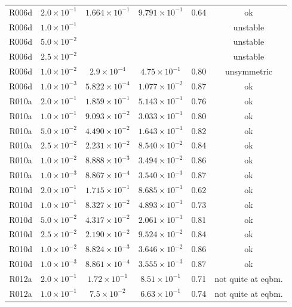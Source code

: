 \begin{table}
\begin{center}
\begin{tabular}{|c|c|c|c|c|c|}
\hline
R006d &  $2.0\times 10^{-1}$ & $1.664\times 10^{-1}$ & $9.791\times10^{-1}$
      & 0.64 & ok\\
R006d &  $1.0\times 10^{-1}$ &  & &  & unstable\\
R006d &  $5.0\times 10^{-2}$ &  & &  & unstable\\
R006d &  $2.5\times 10^{-2}$ &  & &  & unstable\\
R006d &  $1.0\times 10^{-2}$ & $2.9\times 10^{-4}$ & $4.75\times10^{-1}$
      & 0.80 & unsymmetric\\
R006d &  $1.0\times 10^{-3}$ & $5.822\times 10^{-4}$ & $1.077\times10^{-2}$
      & 0.87 & ok \\
\hline
R010a & $2.0\times 10^{-1}$ & $1.859\times 10^{-1}$ & $5.143\times10^{-1}$
      & 0.76 & ok \\
R010a & $1.0\times 10^{-1}$ & $9.093\times 10^{-2}$ & $3.033\times10^{-1}$
      & 0.80 &  ok\\
R010a & $5.0\times 10^{-2}$ & $4.490\times 10^{-2}$ & $1.643\times10^{-1}$
      & 0.82 & ok \\
R010a & $2.5\times 10^{-2}$ & $2.231\times 10^{-2}$ & $8.540\times10^{-2}$
      & 0.84 & ok \\
R010a & $1.0\times 10^{-2}$ & $8.888\times 10^{-3}$ & $3.494\times10^{-2}$
      & 0.86 & ok \\
R010a & $1.0\times 10^{-3}$ & $8.867\times 10^{-4}$ & $3.540\times10^{-3}$
      & 0.87 & ok \\
\hline
R010d & $2.0\times 10^{-1}$ & $1.715\times 10^{-1}$ & $8.685\times10^{-1}$
      & 0.62 & ok \\
R010d & $1.0\times 10^{-1}$ & $8.327\times 10^{-2}$ & $4.893\times10^{-1}$
      & 0.73 & ok \\
R010d & $5.0\times 10^{-2}$ & $4.317\times 10^{-2}$ & $2.061\times10^{-1}$
      & 0.81 & ok \\
R010d & $2.5\times 10^{-2}$ & $2.190\times 10^{-2}$ & $9.524\times10^{-2}$
      & 0.84 & ok \\
R010d & $1.0\times 10^{-2}$ & $8.824\times 10^{-3}$ & $3.646\times10^{-2}$
      & 0.86 & ok \\
R010d & $1.0\times 10^{-3}$ & $8.861\times 10^{-4}$ & $3.555\times10^{-3}$
      & 0.87 & ok \\
\hline
R012a & $2.0\times 10^{-1}$ & $1.72\times 10^{-1}$ & $8.51\times10^{-1}$
      & 0.71 &  not quite at eqbm.\\
R012a & $1.0\times 10^{-1}$ & $7.5\times 10^{-2}$ & $6.63\times10^{-1}$
      & 0.74 &  not quite at eqbm.\\

\end{tabular}
\end{center}
\end{table}
